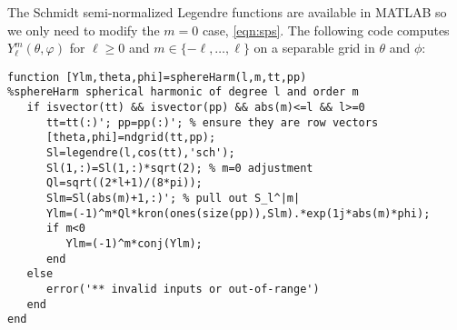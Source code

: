 \documentclass[a4paper,10pt]{article}
\begin{document}
The Schmidt semi-normalized Legendre functions are available in MATLAB so we only need to modify the $m=0$ case, \eqref{eqn:sps}.  The following code computes $Y_{\ell}^{m}(\theta,\varphi)$ for $\ell\geq0$ and $m\in\{-\ell,\dotsc,\ell\}$ on a separable grid in $\theta$ and $\phi$:
\color{blue}\begin{verbatim}
function [Ylm,theta,phi]=sphereHarm(l,m,tt,pp)
%sphereHarm spherical harmonic of degree l and order m
   if isvector(tt) && isvector(pp) && abs(m)<=l && l>=0
      tt=tt(:)'; pp=pp(:)'; % ensure they are row vectors
      [theta,phi]=ndgrid(tt,pp);
      Sl=legendre(l,cos(tt),'sch');
      Sl(1,:)=Sl(1,:)*sqrt(2); % m=0 adjustment
      Ql=sqrt((2*l+1)/(8*pi));
      Slm=Sl(abs(m)+1,:)'; % pull out S_l^|m|
      Ylm=(-1)^m*Ql*kron(ones(size(pp)),Slm).*exp(1j*abs(m)*phi);
      if m<0
         Ylm=(-1)^m*conj(Ylm);
      end
   else
      error('** invalid inputs or out-of-range')
   end
end\end{verbatim}\color{black}
\end{document}
